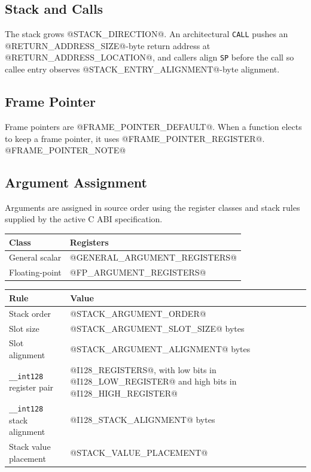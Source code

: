 \subsection{Stack and Calls}
The stack grows @STACK_DIRECTION@. An architectural \texttt{CALL} pushes an
@RETURN_ADDRESS_SIZE@-byte return address at @RETURN_ADDRESS_LOCATION@, and
callers align \texttt{SP} before the call so callee entry observes
@STACK_ENTRY_ALIGNMENT@-byte alignment.

\subsection{Frame Pointer}
Frame pointers are @FRAME_POINTER_DEFAULT@.  When a function elects to keep a
frame pointer, it uses @FRAME_POINTER_REGISTER@.  @FRAME_POINTER_NOTE@

\subsection{Argument Assignment}
Arguments are assigned in source order using the register classes and stack
rules supplied by the active C ABI specification.

\begingroup\footnotesize
\setlength{\tabcolsep}{2pt}
\begin{longtable}{@{}p{1.45in}p{4.05in}@{}}
\toprule
\textbf{Class} & \textbf{Registers}\\
\midrule
\endhead
General scalar & @GENERAL_ARGUMENT_REGISTERS@\\
Floating-point & @FP_ARGUMENT_REGISTERS@\\
\bottomrule
\end{longtable}
\endgroup

\begingroup\footnotesize
\setlength{\tabcolsep}{2pt}
\begin{longtable}{@{}p{1.85in}p{3.65in}@{}}
\toprule
\textbf{Rule} & \textbf{Value}\\
\midrule
\endhead
Stack order & @STACK_ARGUMENT_ORDER@\\
Slot size & @STACK_ARGUMENT_SLOT_SIZE@ bytes\\
Slot alignment & @STACK_ARGUMENT_ALIGNMENT@ bytes\\
\texttt{\_\_int128} register pair & @I128_REGISTERS@, with low bits in @I128_LOW_REGISTER@ and high bits in @I128_HIGH_REGISTER@\\
\texttt{\_\_int128} stack alignment & @I128_STACK_ALIGNMENT@ bytes\\
Stack value placement & @STACK_VALUE_PLACEMENT@\\
\bottomrule
\end{longtable}
\endgroup

